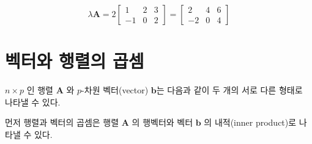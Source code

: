 \documentclass[
  11pt,
  a4paper,
  oneside]{scrbook}
\theoremstyle{definition}
\theoremstyle{plain}
\theoremstyle{definition}
\theoremstyle{definition}
\theoremstyle{remark}
\begin{document}
\[
\lambda \pmb A = 
2
\begin{bmatrix}
1 & 2 & 3 \\
-1 & 0 & 2
\end{bmatrix}
=
\begin{bmatrix}
2 & 4 & 6 \\
-2 & 0 & 4
\end{bmatrix}
\]

\section{벡터와 행렬의
곱셈}\label{uxbca1uxd130uxc640-uxd589uxb82cuxc758-uxacf1uxc148}

\(n \times p\) 인 행렬 \(\pmb A\) 와 \(p\)-차원 벡터(vector)
\(\pmb b\)는 다음과 같이 두 개의 서로 다른 형태로 나타낼 수 있다.

먼저 행렬과 벡터의 곱셈은 행렬 \(\pmb A\) 의 행벡터와 벡터 \(\pmb b\) 의
내적(inner product)로 나타낼 수 있다.
\end{document}
